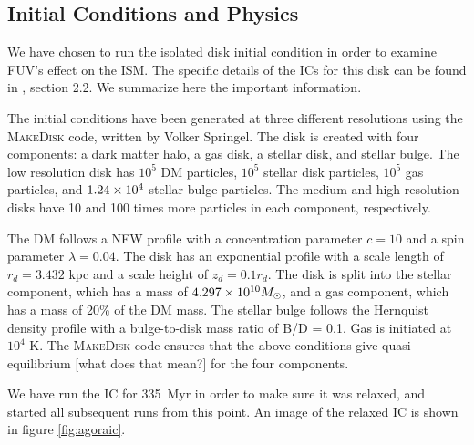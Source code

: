 \subsection{Initial Conditions and Physics}
\label{sec:initialconditions}

We have chosen to run the isolated disk initial condition in order to examine FUV's effect on the ISM. The specific details of the ICs for this disk can be found in \citet{kimEt14}, section 2.2. We summarize here the important information.

The initial conditions have been generated at three different resolutions using the \textsc{MakeDisk} code, written by Volker Springel. The disk is created with four components: a dark matter halo, a gas disk, a stellar disk, and stellar bulge. The low resolution disk has $10^5$ DM particles, $10^5$ stellar disk particles, $10^5$ gas particles, and $1.24\times 10^{4}$ stellar bulge particles. The medium and high resolution disks have 10 and 100 times more particles in each component, respectively.

The DM follows a NFW profile \citep{navarroEt97} with a concentration parameter $c = 10$ and a spin parameter $\lambda = 0.04$. The disk has an exponential profile with a scale length of $r_d = 3.432$ kpc and a scale height of $z_d = 0.1 r_d$. The disk is split into the stellar component, which has a mass of $4.297\times 10^{10} M_{\odot}$, and a gas component, which has a mass of 20\% of the DM mass. The stellar bulge follows the Hernquist \citeyear{hernquist90} density profile with a bulge-to-disk mass ratio of B/D = 0.1. Gas is initiated at $10^4$ K. The \textsc{MakeDisk} code ensures that the above conditions give quasi-equilibrium [what does that mean?] for the four components. 

We have run the IC for 335~Myr in order to make sure it was relaxed, and started all subsequent runs from this point. An image of the relaxed IC is shown in figure \ref{fig:agoraic}.

